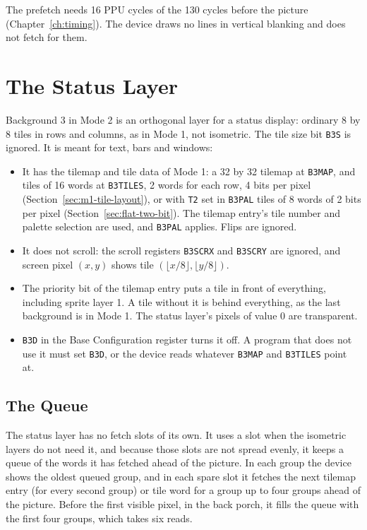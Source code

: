 The prefetch needs 16 PPU cycles of the 130 cycles before the picture (Chapter~\ref{ch:timing}). The device draws no
lines in vertical blanking and does not fetch for them.

\section{The Status Layer}
\label{sec:m2-status-layer}

Background 3 in Mode 2 is an orthogonal layer for a status display: ordinary 8 by 8 tiles in rows and columns, as in
Mode 1, not isometric. The tile size bit \texttt{B3S} is ignored. It is meant for text, bars and windows:

\begin{itemize}
	\item It has the tilemap and tile data of Mode 1: a 32 by 32 tilemap at \texttt{B3MAP}, and tiles of 16 words at
	      \texttt{B3TILES}, 2 words for each row, 4 bits per pixel (Section~\ref{sec:m1-tile-layout}), or with \texttt{T2} set in
	      \texttt{B3PAL} tiles of 8 words of 2 bits per pixel (Section~\ref{sec:flat-two-bit}). The tilemap entry's tile number
	      and palette selection are used, and \texttt{B3PAL} applies. Flips are ignored.
	\item It does not scroll: the scroll registers \texttt{B3SCRX} and \texttt{B3SCRY} are ignored, and screen pixel $(x, y)$
	      shows tile $(\lfloor x/8 \rfloor, \lfloor y/8 \rfloor)$.
	\item The priority bit of the tilemap entry puts a tile in front of everything, including sprite layer 1. A tile without it
	      is behind everything, as the last background is in Mode 1. The status layer's pixels of value 0 are transparent.
	\item \texttt{B3D} in the Base Configuration register turns it off. A program that does not use it must set \texttt{B3D},
	      or the device reads whatever \texttt{B3MAP} and \texttt{B3TILES} point at.
\end{itemize}

\subsection{The Queue}

The status layer has no fetch slots of its own. It uses a slot when the isometric layers do not need it, and because
those slots are not spread evenly, it keeps a queue of the words it has fetched ahead of the picture. In each group the
device shows the oldest queued group, and in each spare slot it fetches the next tilemap entry (for every second group)
or tile word for a group up to four groups ahead of the picture. Before the first visible pixel, in the back porch, it
fills the queue with the first four groups, which takes six reads.

